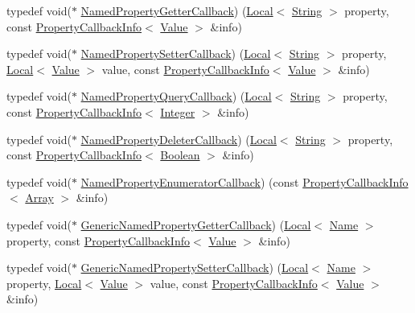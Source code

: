 \begin{DoxyCompactItemize}
\item 
typedef void($\ast$ \hyperlink{namespacev8_a50cae386a68bf9ff23d02aa1161face4}{Named\+Property\+Getter\+Callback}) (\hyperlink{classv8_1_1_local}{Local}$<$ \hyperlink{classv8_1_1_string}{String} $>$ property, const \hyperlink{classv8_1_1_property_callback_info}{Property\+Callback\+Info}$<$ \hyperlink{classv8_1_1_value}{Value} $>$ \&info)
\item 
typedef void($\ast$ \hyperlink{namespacev8_a9587769513971dc7cb301b740d9e66b6}{Named\+Property\+Setter\+Callback}) (\hyperlink{classv8_1_1_local}{Local}$<$ \hyperlink{classv8_1_1_string}{String} $>$ property, \hyperlink{classv8_1_1_local}{Local}$<$ \hyperlink{classv8_1_1_value}{Value} $>$ value, const \hyperlink{classv8_1_1_property_callback_info}{Property\+Callback\+Info}$<$ \hyperlink{classv8_1_1_value}{Value} $>$ \&info)
\item 
typedef void($\ast$ \hyperlink{namespacev8_ac135beae5f0c8b290255accb438f990e}{Named\+Property\+Query\+Callback}) (\hyperlink{classv8_1_1_local}{Local}$<$ \hyperlink{classv8_1_1_string}{String} $>$ property, const \hyperlink{classv8_1_1_property_callback_info}{Property\+Callback\+Info}$<$ \hyperlink{classv8_1_1_integer}{Integer} $>$ \&info)
\item 
typedef void($\ast$ \hyperlink{namespacev8_aaba861076c5b111912cfa0791d348437}{Named\+Property\+Deleter\+Callback}) (\hyperlink{classv8_1_1_local}{Local}$<$ \hyperlink{classv8_1_1_string}{String} $>$ property, const \hyperlink{classv8_1_1_property_callback_info}{Property\+Callback\+Info}$<$ \hyperlink{classv8_1_1_boolean}{Boolean} $>$ \&info)
\item 
typedef void($\ast$ \hyperlink{namespacev8_a5f6f16818a9cddacadbfe6d90ca3a6b1}{Named\+Property\+Enumerator\+Callback}) (const \hyperlink{classv8_1_1_property_callback_info}{Property\+Callback\+Info}$<$ \hyperlink{classv8_1_1_array}{Array} $>$ \&info)
\item 
typedef void($\ast$ \hyperlink{namespacev8_a24b1801fa53a7c5a71366d8044927563}{Generic\+Named\+Property\+Getter\+Callback}) (\hyperlink{classv8_1_1_local}{Local}$<$ \hyperlink{classv8_1_1_name}{Name} $>$ property, const \hyperlink{classv8_1_1_property_callback_info}{Property\+Callback\+Info}$<$ \hyperlink{classv8_1_1_value}{Value} $>$ \&info)
\item 
typedef void($\ast$ \hyperlink{namespacev8_af74716c6e95a269c6cd4314662fd0a7e}{Generic\+Named\+Property\+Setter\+Callback}) (\hyperlink{classv8_1_1_local}{Local}$<$ \hyperlink{classv8_1_1_name}{Name} $>$ property, \hyperlink{classv8_1_1_local}{Local}$<$ \hyperlink{classv8_1_1_value}{Value} $>$ value, const \hyperlink{classv8_1_1_property_callback_info}{Property\+Callback\+Info}$<$ \hyperlink{classv8_1_1_value}{Value} $>$ \&info)

\end{DoxyCompactItemize}

